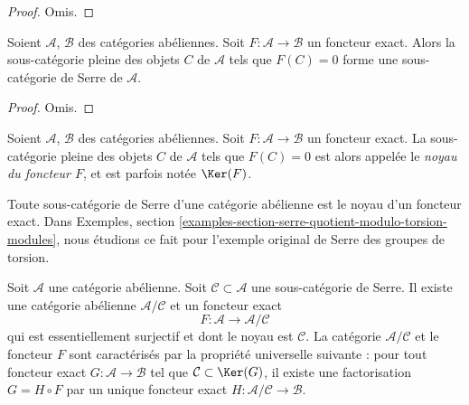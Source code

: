 \begin{proof}
Omis.
\end{proof}

\begin{lemma}
\label{lemma-kernel-exact-functor}
Soient $\mathcal{A}$, $\mathcal{B}$ des catégories abéliennes.
Soit $F : \mathcal{A} \to \mathcal{B}$ un foncteur exact.
Alors la sous-catégorie pleine des objets $C$ de $\mathcal{A}$
tels que $F(C) = 0$ forme une sous-catégorie de Serre de $\mathcal{A}$.
\end{lemma}

\begin{proof}
Omis.
\end{proof}

\begin{definition}
\label{definition-kernel-category}
Soient $\mathcal{A}$, $\mathcal{B}$ des catégories abéliennes.
Soit $F : \mathcal{A} \to \mathcal{B}$ un foncteur exact.
La sous-catégorie pleine des objets $C$ de $\mathcal{A}$
tels que $F(C) = 0$ est alors appelée le {\it noyau du foncteur $F$},
et est parfois notée $\Ker(F)$.
\end{definition}

\noindent
Toute sous-catégorie de Serre d'une catégorie abélienne est le noyau
d'un foncteur exact. Dans
Exemples, section \ref{examples-section-serre-quotient-modulo-torsion-modules},
nous étudions ce fait pour l'exemple original de Serre des groupes de torsion.

\begin{lemma}
\label{lemma-serre-subcategory-is-kernel}
Soit $\mathcal{A}$ une catégorie abélienne.
Soit $\mathcal{C} \subset \mathcal{A}$ une sous-catégorie de Serre.
Il existe une catégorie abélienne $\mathcal{A}/\mathcal{C}$
et un foncteur exact
$$
F : \mathcal{A} \longrightarrow \mathcal{A}/\mathcal{C}
$$
qui est essentiellement surjectif et dont le noyau est $\mathcal{C}$.
La catégorie $\mathcal{A}/\mathcal{C}$ et le foncteur $F$ sont
caractérisés par la propriété universelle suivante : pour tout foncteur exact
$G : \mathcal{A} \to \mathcal{B}$ tel que
$\mathcal{C} \subset \Ker(G)$, il existe une factorisation
$G = H \circ F$ par un unique foncteur exact
$H : \mathcal{A}/\mathcal{C} \to \mathcal{B}$.
\end{lemma}

